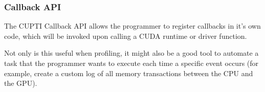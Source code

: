 \subsubsection{Callback API}
\label{sec:cuda:prof:callback}

The CUPTI Callback API allows the programmer to register callbacks in it's own code, which will be invoked upon calling a CUDA runtime or driver function.

Not only is this useful when profiling, it might also be a good tool to automate a task that the programmer wants to execute each time a specific event occurs (for example, create a custom log of all memory transactions between the CPU and the GPU).
